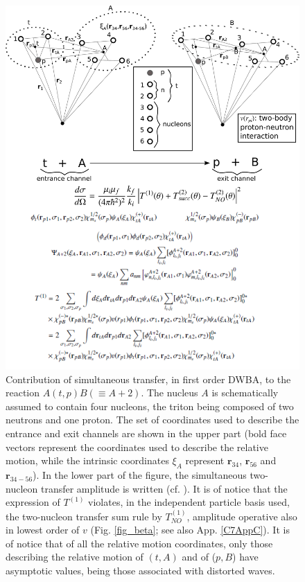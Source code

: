 \begin{figure}
\centerline{\includegraphics*[width=\textwidth,angle=0]{nutshell/figs/fig_alpha.pdf}}
\caption{Contribution of simultaneous transfer, in first order DWBA, to the reaction $A(t,p)B(\equiv A+2)$. The nucleus $A$ is schematically assumed to contain four nucleons, the triton being composed of two neutrons and one proton. The set of coordinates used to describe the entrance and exit channels are shown in the upper part (bold face vectors represent the coordinates used to describe the relative motion, while the intrinsic coordinates $\xi_A$ represent $\mathbf r_{34}$, $\mathbf r_{56}$ and $\mathbf r_{34-56}$). In the lower part of the figure, the simultaneous two-nucleon transfer amplitude is written (cf. \cite{Potel:13b}). It is of notice that the expression of $T^{(1)}$ violates, in the independent particle basis used, the  two-nucleon transfer sum rule by  $T^{(1)}_{NO}$, amplitude operative also in lowest order of $v$ (Fig. \ref{fig_beta}; see also App. \ref{C7AppC}). It is of notice that of all the relative motion coordinates, only those describing the relative motion of $(t,A)$ and of ($p,B$) have asymptotic values, being those associated with distorted waves.}\label{fig_alpha}
\end{figure}
